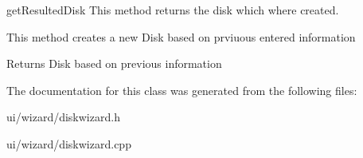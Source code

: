 get\+Resulted\+Disk This method returns the disk which where created. 

This method creates a new Disk based on prviuous entered information \begin{DoxyReturn}{Returns}
Disk based on previous information 
\end{DoxyReturn}


The documentation for this class was generated from the following files\+:\begin{DoxyCompactItemize}
\item 
ui/wizard/diskwizard.\+h\item 
ui/wizard/diskwizard.\+cpp\end{DoxyCompactItemize}
